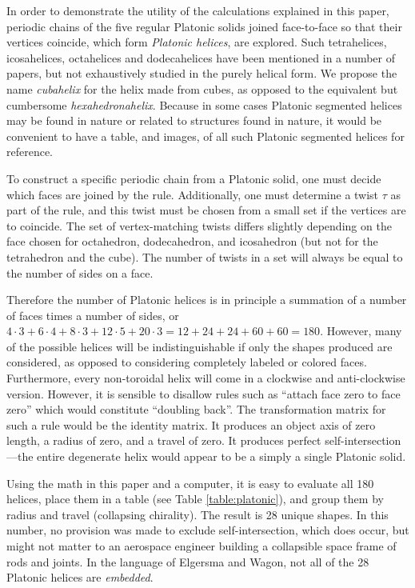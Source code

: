 \documentclass[11pt]{article}
\begin{document}
{In order to demonstrate the utility of the calculations explained in this paper,
periodic chains of the five regular Platonic solids joined face-to-face so that their vertices coincide,
which form {\em Platonic helices}, are explored.
Such tetrahelices, icosahelices, octahelices and dodecahelices
have been mentioned in a number of papers\cite{elgersma2016quadrahelix,babiker2012combinatorial,lord2001sphere}, but not exhaustively studied in
the purely helical form.
We propose the name {\em cubahelix} for the helix made from cubes, as opposed to the equivalent
but cumbersome {\em hexahedronahelix}.
Because in some cases Platonic segmented helices may be found in nature or
related to structures found in nature\cite{lord2004gamma,pearce1990structure},
it would be convenient to have a table, and images, of all such Platonic segmented helices for reference.

To construct a specific periodic chain from a Platonic solid,
one must decide which faces are joined by the rule.
Additionally, one must determine a twist
$\tau$ as part of the rule, and this twist must be chosen from a small set if the vertices are to coincide.
The set of vertex-matching twists differs slightly depending on the face chosen for octahedron, dodecahedron, and icosahedron
(but not for the tetrahedron and the cube). The number of twists in a set will always be equal to the number of sides on a face.

Therefore the number of Platonic helices is in principle a summation of a number of faces times a number of sides, or
$4 \cdot 3 + 6 \cdot 4 + 8 \cdot 3 + 12 \cdot 5 + 20 \cdot 3 = 12 + 24 + 24 + 60 + 60 = 180$.
However, many of the possible helices will be indistinguishable if only the shapes produced are considered,
as opposed to considering completely labeled or colored faces.
Furthermore, every non-toroidal helix will come in a clockwise and anti-clockwise version.
However, it is sensible to disallow rules such as ``attach face zero to face zero''
which would constitute
``doubling back''\cite{elgersma2016quadrahelix}.
The transformation matrix for such a rule would be the identity matrix.
It produces an object axis of zero length, a radius of zero, and
a travel of zero. It produces perfect self-intersection---the entire
degenerate helix would appear to be a simply a single Platonic solid.

Using the math in this paper and a computer, it is easy to evaluate all 180 helices,
place them in a table (see Table \ref{table:platonic}), and group them
by radius and travel (collapsing chirality).
The result is 28 unique shapes. In this number, no provision was made to exclude
self-intersection,
which does occur, but might not matter to
an aerospace engineer building a collapsible space frame of rods and joints.
In the language of Elgersma and Wagon\cite{elgersma2016quadrahelix}, not
all of the 28 Platonic helices are {\em embedded}.

}
\end{document}
